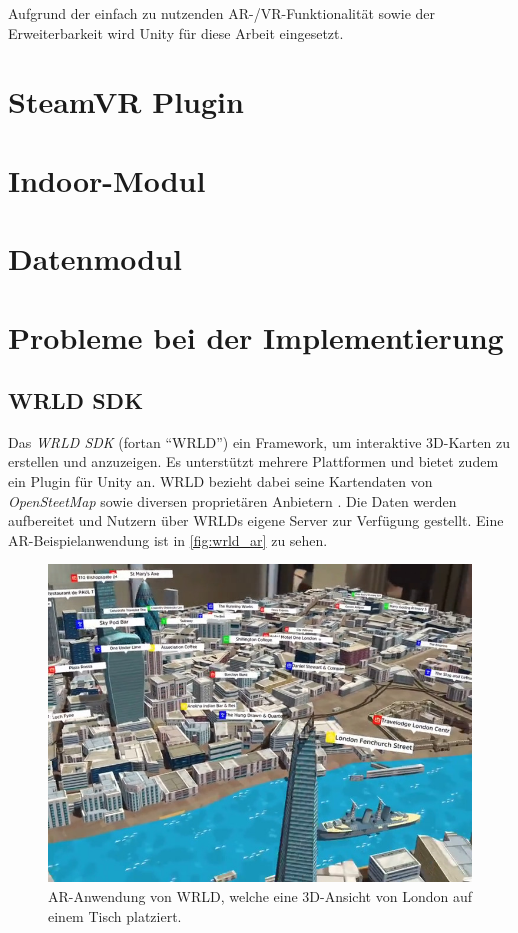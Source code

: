 Aufgrund der einfach zu nutzenden AR-/VR-Funktionalität sowie der Erweiterbarkeit wird Unity für diese Arbeit eingesetzt.

\section{SteamVR Plugin}

\section{Indoor-Modul} %

\section{Datenmodul} %

\section{Probleme bei der Implementierung}

\subsection{WRLD SDK}

Das \emph{WRLD SDK} (fortan \enquote{WRLD}) ein Framework, um interaktive 3D-Karten zu erstellen und anzuzeigen.
Es unterstützt mehrere Plattformen und bietet zudem ein Plugin für Unity an.
WRLD bezieht dabei seine Kartendaten von \emph{OpenSteetMap} sowie diversen proprietären Anbietern \parencite{WRLD2018}.
Die Daten werden aufbereitet und Nutzern über WRLDs eigene Server zur Verfügung gestellt.
Eine AR-Beispielanwendung ist in \autoref{fig:wrld_ar} zu sehen.
\begin{figure}
    \centering
    \includegraphics[width=\textwidth]{figures/wrld_ar-web-11}
    \caption{AR-Anwendung von WRLD, welche eine 3D-Ansicht von London auf einem Tisch platziert.}
    \label{fig:wrld_ar}
\end{figure}

